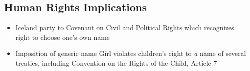 \subsection{Human Rights Implications}

\begin{itemize}
	\item Iceland party to Covenant on Civil and Political Rights which recognizes right to choose one's own name
	\item Imposition of generic name Girl violates children's right to \textit{a} name of several treaties, including Convention on the Rights of the Child, Article 7 
\end{itemize}
